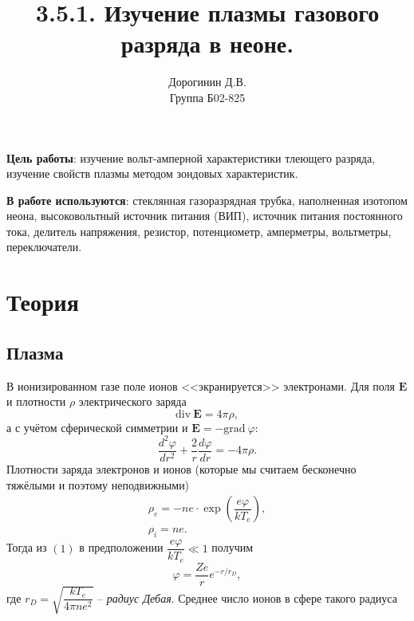 \documentclass[a4paper,12pt]{article}
\author{Дорогинин Д.В.\\
Группа Б02-825}
\title{3.5.1. Изучение плазмы газового разряда в неоне.}
\date{}
\begin{document}
\maketitle
\textbf{Цель работы}: изучение вольт-амперной характеристики тлеющего разряда, изучение свойств плазмы методом зондовых характеристик.


\textbf{В работе используются}: стеклянная газоразрядная трубка, наполненная изотопом неона, высоковольтный источник питания (ВИП), источник питания постоянного тока, делитель напряжения, резистор, потенциометр, амперметры, вольтметры, переключатели.
\section*{Теория}
\subsection*{Плазма}
В ионизированном газе поле ионов <<экранируется>> электронами. Для поля $\mathbf{E}$ и плотности $\rho$ электрического заряда
$$
\text{div}~\mathbf{E} = 4 \pi \rho,
$$
а с учётом сферической симметрии и $\mathbf{E} = -\text{grad}~\varphi$:
\begin{equation}
\dfrac{d^2 \varphi}{dr^2}+\dfrac{2}{r}\dfrac{d\varphi}{dr}=-4\pi \rho.
\end{equation}
Плотности заряда электронов и ионов (которые мы считаем бесконечно тяжёлыми и поэтому неподвижными)
\begin{equation}
\begin{array}{c}
\rho_e = -ne \cdot \exp\left(\dfrac{e\varphi}{kT_e}\right),\\
\rho_i = ne.
\end{array}
\end{equation}
Тогда из $(1)$ в предположении $\dfrac{e\varphi}{kT_e} \ll 1$ получим
\begin{equation}
\varphi = \dfrac{Ze}{r}e^{-r/r_D},
\end{equation}
где $r_D = \sqrt{\dfrac{kT_e}{4\pi n e^2}}$ -- \textit{радиус Дебая}. Среднее число ионов в сфере такого радиуса 
\end{document}
